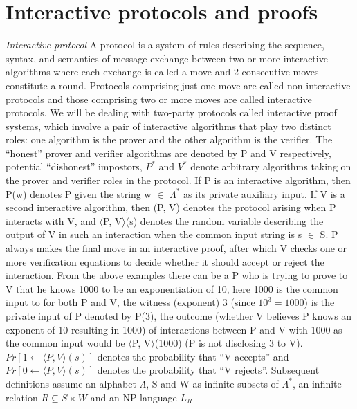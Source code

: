 \documentclass[a4paper]{article}
\newcommand{\quotes}[1]{``#1''}
\begin{document}
\section{Interactive protocols and proofs}
\textit{Interactive protocol} A protocol is a system of rules describing the sequence, syntax, and semantics of message exchange between two or more interactive algorithms where each exchange is called a move and 2 consecutive moves constitute a round. Protocols comprising just one move are called non-interactive protocols and those comprising two or more moves are called interactive protocols. We will be dealing with two-party protocols called interactive proof systems, which involve a pair of interactive algorithms that play two distinct roles: one algorithm is the prover and the other algorithm is the verifier. The \quotes{honest} prover and verifier algorithms are denoted by P and V respectively, potential \quotes{dishonest} impostors, \textit{$P^{*}$} and \textit{$V^{*}$} denote arbitrary algorithms taking on the prover and verifier roles in the protocol. If P is an interactive algorithm, then P(w) denotes P given the string w $\in$ \(\Lambda^{*}\) as its private auxiliary input. If V is a second interactive algorithm, then (P, V) denotes the protocol arising when P interacts with V, and $\langle$P, V$\rangle$(s) denotes the random variable describing the output of V in such an interaction when the common input string is s $\in$ S. P always makes the final move in an interactive proof, after which V checks one or more verification equations to decide whether it should accept or reject the interaction. From the above examples there can be a P who is trying to prove to V that he knows 1000 to be an exponentiation of 10, here 1000 is the common input to for both P and V, the witness (exponent) 3 (since $10^3=1000$) is the private input of P denoted by P(3), the outcome (whether V believes P knows an exponent of 10 resulting in 1000) of interactions between P and V with 1000 as the common input would be $\langle$P, V$\rangle$(1000) (P is not disclosing 3 to V). 
$Pr[1 \gets \langle P, V \rangle (s)]$ denotes the probability that \quotes{V accepts} and $Pr[0 \gets \langle P, V \rangle (s)]$ denotes the probability that \quotes{V rejects}. 
\newline
Subsequent definitions assume an alphabet \(\Lambda\), S and W as infinite subsets of \(\Lambda^{*}\), an infinite relation $R \subseteq S \times W$ and an NP language \textit{$L_R$} 
\newline
\newline
\end{document}
